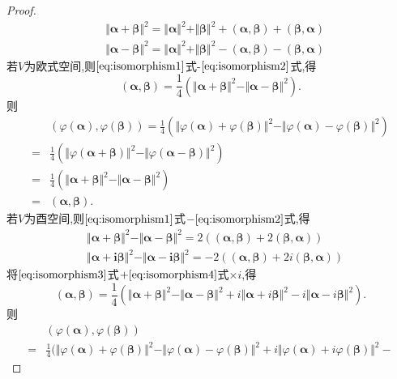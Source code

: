 \begin{example}
\begin{proof}
  \begin{align}
    & \Vert\bm{\alpha}+\bm{\beta}\Vert^2 = \Vert\bm{\alpha}\Vert^2+
      \Vert\bm{\beta}\Vert^2+(\bm{\alpha},\bm{\beta})+
      (\bm{\beta},\bm{\alpha})\label{eq:isomorphism1}\\
    & \Vert\bm{\alpha}-\bm{\beta}\Vert^2 = \Vert\bm{\alpha}\Vert^2+
      \Vert\bm{\beta}\Vert^2-(\bm{\alpha},\bm{\beta})-
      (\bm{\beta},\bm{\alpha})\label{eq:isomorphism2}
  \end{align}
  若$V$为欧式空间,则$\eqref{eq:isomorphism1}$式-$\eqref{eq:isomorphism2}$式,得
  \[
    (\bm{\alpha},\bm{\beta}) = \frac{1}{4}(\Vert\bm{\alpha}+\bm{\beta}\Vert^2-\Vert\bm{\alpha}-\bm{\beta}\Vert^2).
  \]
  则
  \begin{align*}
    & (\varphi(\bm{\alpha}),\varphi(\bm{\beta})) =
      \frac{1}{4}(\Vert\varphi(\bm{\alpha})+\varphi(\bm{\beta})\Vert^2-\Vert\varphi(\bm{\alpha})-\varphi(\bm{\beta})\Vert^2)\\
    = & \frac{1}{4}(\Vert\varphi(\bm{\alpha}+\bm{\beta})\Vert^2-\Vert\varphi(\bm{\alpha}-\bm{\beta})\Vert^2)\\
    = & \frac{1}{4}(\Vert\bm{\alpha}+\bm{\beta}\Vert^2-\Vert\bm{\alpha}-\bm{\beta}\Vert^2)\\
    = & (\bm{\alpha},\bm{\beta}).
  \end{align*}
  若$V$为酉空间,则$\eqref{eq:isomorphism1}$式$-\eqref{eq:isomorphism2}$式,得
  \begin{align}
    & \Vert\bm{\alpha}+\bm{\beta}\Vert^2-\Vert\bm{\alpha}-\bm{\beta}\Vert^2 =
    2((\bm{\alpha},\bm{\beta})+2(\bm{\beta},\bm{\alpha}))\label{eq:isomorphism3}\\
    & \Vert\bm{\alpha}+\bm{i\beta}\Vert^2-\Vert\bm{\alpha}-\bm{i\beta}\Vert^2 =
    -2((\bm{\alpha},\bm{\beta})+2i(\bm{\beta},\bm{\alpha}))\label{eq:isomorphism4}
  \end{align}
  将$\eqref{eq:isomorphism3}$式$+\eqref{eq:isomorphism4}$式$\times i$,得
  \[
    (\bm{\alpha},\bm{\beta}) =
    \frac{1}{4}(\Vert\bm{\alpha}+\bm{\beta}\Vert^2-
    \Vert\bm{\alpha}-\bm{\beta}\Vert^2+
    i\Vert\bm{\alpha}+i\bm{\beta}\Vert^2-
    i\Vert\bm{\alpha}-i\bm{\beta}\Vert^2).
  \]
  则
  \begin{align*}
    & (\varphi(\bm{\alpha}),\varphi(\bm{\beta}))\\
      = & \frac{1}{4}(\Vert\varphi(\bm{\alpha})+\varphi(\bm{\beta})\Vert^2-
      \Vert\varphi(\bm{\alpha})-\varphi(\bm{\beta})\Vert^2+
      i\Vert\varphi(\bm{\alpha})+i\varphi(\bm{\beta})\Vert^2-

\end{align*}
\end{proof}
\end{example}
